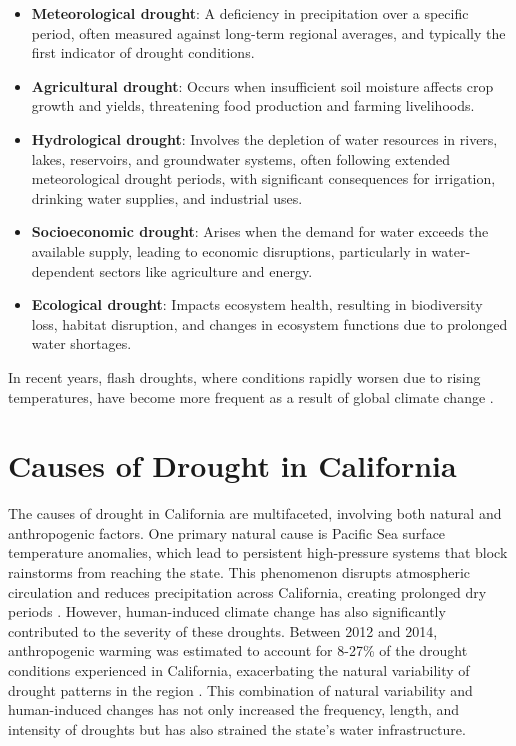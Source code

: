 \documentclass[
]{book}
\providecommand{\tightlist}{%
  \setlength{\itemsep}{0pt}\setlength{\parskip}{0pt}}
\theoremstyle{definition}
\theoremstyle{definition}
\theoremstyle{definition}
\theoremstyle{definition}
\theoremstyle{remark}
\begin{document}
\begin{itemize}
\tightlist
\item
  \textbf{Meteorological drought}: A deficiency in precipitation over a specific period, often measured against long-term regional averages, and typically the first indicator of drought conditions.
\item
  \textbf{Agricultural drought}: Occurs when insufficient soil moisture affects crop growth and yields, threatening food production and farming livelihoods.
\item
  \textbf{Hydrological drought}: Involves the depletion of water resources in rivers, lakes, reservoirs, and groundwater systems, often following extended meteorological drought periods, with significant consequences for irrigation, drinking water supplies, and industrial uses.
\item
  \textbf{Socioeconomic drought}: Arises when the demand for water exceeds the available supply, leading to economic disruptions, particularly in water-dependent sectors like agriculture and energy.
\item
  \textbf{Ecological drought}: Impacts ecosystem health, resulting in biodiversity loss, habitat disruption, and changes in ecosystem functions due to prolonged water shortages.
\end{itemize}

In recent years, flash droughts, where conditions rapidly worsen due to rising temperatures, have become more frequent as a result of global climate change \citep{walker2023}.

\section{Causes of Drought in California}\label{causes-of-drought-in-california}

The causes of drought in California are multifaceted, involving both natural and anthropogenic factors. One primary natural cause is Pacific Sea surface temperature anomalies, which lead to persistent high-pressure systems that block rainstorms from reaching the state. This phenomenon disrupts atmospheric circulation and reduces precipitation across California, creating prolonged dry periods \citep{wei2016}. However, human-induced climate change has also significantly contributed to the severity of these droughts. Between 2012 and 2014, anthropogenic warming was estimated to account for 8-27\% of the drought conditions experienced in California, exacerbating the natural variability of drought patterns in the region \citep{williams2015}. This combination of natural variability and human-induced changes has not only increased the frequency, length, and intensity of droughts but has also strained the state's water infrastructure.
\end{document}
